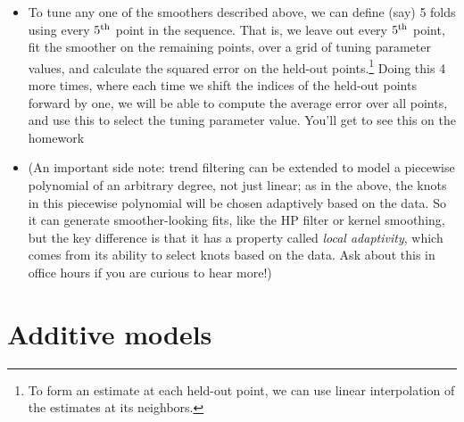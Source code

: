 \documentclass{article}
\begin{document}
\begin{itemize}
\item To tune any one of the smoothers described above, we can define (say) 5
  folds using every $5^{\textnormal{th}}$ point in the sequence. That is, we leave out every
  $5^{\textnormal{th}}$ point, fit the smoother on the remaining points, over a grid of tuning 
  parameter values, and calculate the squared error on the held-out
  points.\footnote{To form an estimate at each held-out point, we can use
    linear interpolation of the estimates at its neighbors.} 
  Doing this 4 more times, where each time we shift the indices of the held-out
  points forward by one, we will be able to compute the average error over all
  points, and use this to select the tuning parameter value. You'll get to see
  this on the homework

\item (An important side note: trend filtering can be extended to model a
  piecewise polynomial of an arbitrary degree, not just linear; as in the above, 
  the knots in this piecewise polynomial will be chosen adaptively based on the 
  data. So it can generate smoother-looking fits, like the HP filter or kernel 
  smoothing, but the key difference is that it has a property called \emph{local
    adaptivity}, which comes from its ability to select knots based on the
  data. Ask about this in office hours if you are curious to hear more!) 
\end{itemize}

\section{Additive models}
\end{document}
